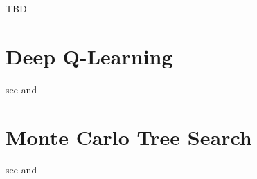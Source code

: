 TBD



\section{Deep Q-Learning}

see \cite{Watkins1992} and \cite{https://doi.org/10.48550/arxiv.1805.07470}


\section{Monte Carlo Tree Search}

see \cite{https://doi.org/10.48550/arxiv.1805.07470} and \cite{AlphaGo}